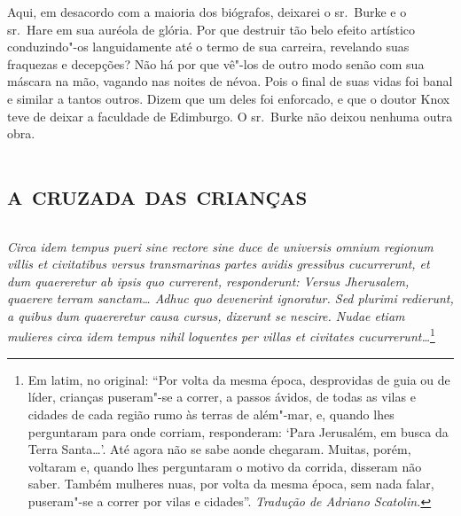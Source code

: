 Aqui, em desacordo com a maioria dos biógrafos, deixarei o sr.~Burke e o
sr.~Hare em sua auréola de glória. Por que destruir tão belo efeito
artístico conduzindo"-os languidamente até o termo de sua carreira,
revelando suas fraquezas e decepções? Não há por que vê"-los de outro modo
senão com sua máscara na mão, vagando nas noites de névoa. Pois o final de
suas vidas foi banal e similar a tantos outros. Dizem que um deles foi
enforcado, e que o doutor Knox teve de deixar a faculdade de Edimburgo. O
sr.~Burke não deixou nenhuma outra obra.


\part{\textsc{a cruzada das crianças}}

\chapter*{}
\thispagestyle{empty}
{\itshape
Circa idem tempus pueri sine rectore sine duce de universis omnium regionum villis et civitatibus 
versus transmarinas partes avidis gressibus cucurrerunt, et dum quaereretur ab ipsis quo currerent, 
responderunt: Versus Jherusalem, quaerere terram sanctam\ldots{} Adhuc quo devenerint ignoratur. 
Sed plurimi redierunt, a quibus dum quaereretur causa cursus, dixerunt se nescire. Nudae etiam mulieres 
circa idem tempus nihil loquentes per villas et civitates cucurrerunt\ldots{}}\footnote{ Em latim, no original: ``Por volta da mesma época, 
desprovidas de guia ou de líder,  crianças puseram"-se a correr, a passos ávidos, de todas as vilas e cidades de cada região rumo às terras 
de além"-mar, e, quando lhes perguntaram para onde corriam, responderam: ‘Para Jerusalém, em busca da Terra Santa\ldots{}’. 
Até agora não se sabe aonde chegaram. Muitas, porém, voltaram e, quando lhes perguntaram o motivo da corrida, disseram não saber. 
Também mulheres nuas, por volta da mesma época, sem nada falar, puseram"-se a correr por vilas e cidades''. \textit{Tradução de Adriano Scatolin.}}


